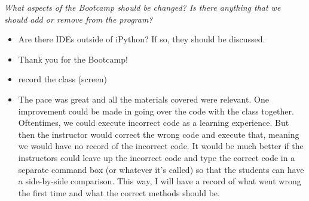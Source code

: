 \begin{boenumerate}
\item \textit{What aspects of the Bootcamp should be changed? Is there anything that we should add or remove from the program?}
\begin{itemize}
\item Are there IDEs outside of iPython? If so, they should be discussed.
\item Thank you for the Bootcamp!
\item record the class (screen)
\item The pace was great and all the materials covered were relevant. One improvement could be made in going over the code with the class together. Oftentimes, we could execute incorrect code as a learning experience. But then the instructor would correct the wrong code and execute that, meaning we would have no record of the incorrect code. It would be much better if the instructors could leave up the incorrect code and type the correct code in a separate command box (or whatever it's called) so that the students can have a side-by-side comparison. This way, I will have a record of what went wrong the first time and what the correct methods should be.

\end{itemize}

\end{boenumerate}